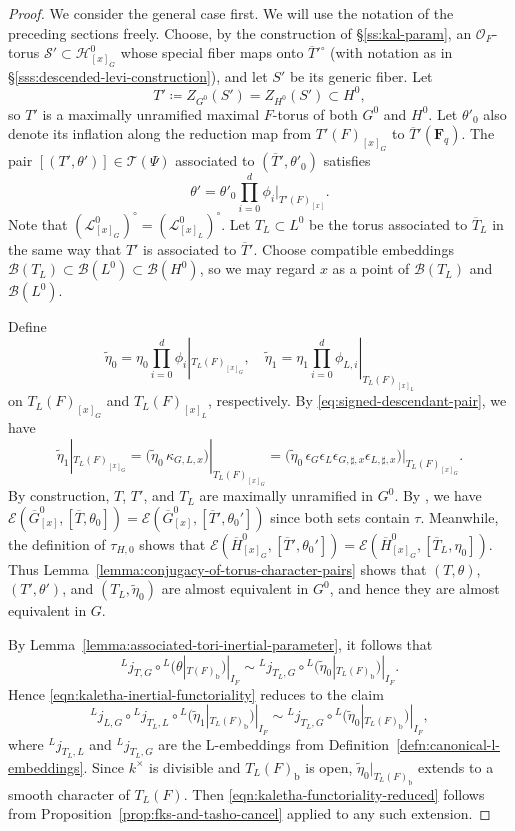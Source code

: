 \documentclass[reqno]{amsart}
\numberwithin{equation}{subsection}
\newcommand{\F}{\mathbf{F}}
\newcommand{\wt}[1]{\widetilde{#1}}
\newcommand{\ol}[1]{\overline{#1}}
\newcommand{\ld}{{}^L}
\newcommand\cB{\mathcal{B}}
\newcommand\cE{\mathcal{E}}
\newcommand\cH{\mathcal{H}}
\newcommand\cL{\mathcal{L}}
\newcommand\cO{\mathcal{O}}
\newcommand\cS{\mathcal{S}}
\newcommand\cT{\mathcal{T}}
\theoremstyle{remark}
\numberwithin{equation}{subsection}
\numberwithin{figure}{subsection}
\begin{document}
\begin{proof}
We consider the general case first. We will use the notation of the preceding sections freely. Choose, by the construction of \S\ref{ss:kal-param}, an $\cO_F$-torus $\cS'\subset\cH^0_{[x]_G}$ whose special fiber maps onto $\ol T'^{\circ}$ (with notation as in \S\ref{sss:descended-levi-construction}), and let $S'$ be its generic fiber. Let
\[
T'\coloneqq Z_{G^0}(S')=Z_{H^0}(S')\subset H^0,
\]
so $T'$ is a maximally unramified maximal $F$-torus of both $G^0$ and $H^0$. Let $\theta'_0$ also denote its inflation along the reduction map from $T'(F)_{[x]_G}$ to $\ol T'(\F_q)$. The pair $[(T',\theta')]\in\cT(\Psi)$ associated to $(\ol T',\theta'_0)$ satisfies
\[
\theta'=\theta'_0\prod_{i=0}^d\phi_i|_{T'(F)_{[x]}}.
\]
Note that $(\cL^0_{[x]_G})^\circ=(\cL^0_{[x]_L})^\circ$. Let $T_L \subset L^0$ be the torus associated to $\ol T_L$ in the same way that $T'$ is associated to $\ol T'$. Choose compatible embeddings $\cB(T_L)\subset\cB(L^0)\subset\cB(H^0)$, so we may regard $x$ as a point of $\cB(T_L)$ and $\cB(L^0)$.

Define
\[
\wt\eta_0 =\eta_0\prod_{i=0}^d\phi_i|_{T_L(F)_{[x]_G}}, \quad
\wt\eta_1
=\eta_1\prod_{i=0}^d\phi_{L,i}|_{T_L(F)_{[x]_L}}
\]
on $T_L(F)_{[x]_G}$ and $T_L(F)_{[x]_L}$, respectively.
By \eqref{eq:signed-descendant-pair}, we have 
\[
\wt\eta_1|_{T_L(F)_{[x]_G}}
=\bigl(\wt\eta_0\,\kappa_{G,L,x}\bigr)|_{T_L(F)_{[x]_G}}
=\bigl(\wt\eta_0\,\epsilon_G\epsilon_L
\epsilon_{G,\sharp,x}\epsilon_{L,\sharp,x}\bigr)|_{T_L(F)_{[x]_G}}.
\]
By construction, $T$, $T'$, and $T_L$ are maximally unramified in $G^0$. By \cite[Lemma~2.8.4]{Cot26b}, we have $\cE(\ol G^0_{[x]}, [\ol T, \theta_0]) = \cE(\ol G^0_{[x]}, [\ol T', \theta_0'])$ since both sets contain $\tau$. Meanwhile, the definition of $\tau_{H,0}$ shows that $\cE(\ol H^0_{[x]_G}, [\ol T',\theta_0']) = \cE(\ol H^0_{[x]_G}, [\ol T_L,\eta_0])$. Thus Lemma~\ref{lemma:conjugacy-of-torus-character-pairs} shows that $(T,\theta)$, $(T',\theta')$, and $(T_L,\wt\eta_0)$ are almost equivalent in $G^0$, and hence they are almost equivalent in $G$.

By Lemma~\ref{lemma:associated-tori-inertial-parameter}, it follows that
\[
\ld j_{T,G}\circ\ld(\theta|_{T(F)_{\mathrm b}})|_{I_F}
\sim
\ld j_{T_L,G}\circ\ld(\wt\eta_0|_{T_L(F)_{\mathrm b}})|_{I_F}.
\]
Hence \eqref{eqn:kaletha-inertial-functoriality} reduces to the claim
\begin{equation}\label{eqn:kaletha-functoriality-reduced}
\ld j_{L,G}\circ\ld j_{T_L,L}\circ\ld(\wt\eta_1|_{T_L(F)_{\mathrm b}})|_{I_F}
\sim\ld j_{T_L,G}\circ\ld(\wt\eta_0|_{T_L(F)_{\mathrm b}})|_{I_F},
\end{equation}
where $\ld j_{T_L,L}$ and $\ld j_{T_L,G}$ are the L-embeddings from Definition~\ref{defn:canonical-l-embeddings}. Since $k^\times$ is divisible and $T_L(F)_{\mathrm b}$ is open, $\wt\eta_0|_{T_L(F)_{\mathrm b}}$ extends to a smooth character of $T_L(F)$. Then \eqref{eqn:kaletha-functoriality-reduced} follows from Proposition~\ref{prop:fks-and-tasho-cancel} applied to any such extension.


\end{proof}
\end{document}
